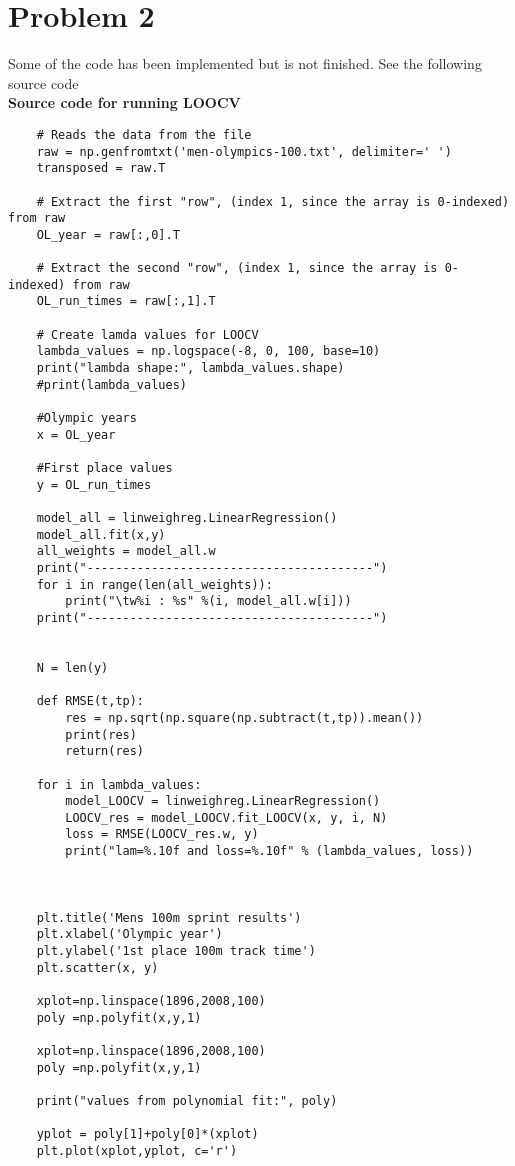 \section{Problem 2}
Some of the code has been implemented but is not finished. See the following source code
\\
\textbf{Source code for running LOOCV}
\begin{lstlisting}
    # Reads the data from the file
    raw = np.genfromtxt('men-olympics-100.txt', delimiter=' ')
    transposed = raw.T

    # Extract the first "row", (index 1, since the array is 0-indexed) from raw
    OL_year = raw[:,0].T

    # Extract the second "row", (index 1, since the array is 0-indexed) from raw
    OL_run_times = raw[:,1].T

    # Create lamda values for LOOCV
    lambda_values = np.logspace(-8, 0, 100, base=10)
    print("lambda shape:", lambda_values.shape)
    #print(lambda_values)

    #Olympic years
    x = OL_year 

    #First place values
    y = OL_run_times

    model_all = linweighreg.LinearRegression()
    model_all.fit(x,y)
    all_weights = model_all.w
    print("----------------------------------------")
    for i in range(len(all_weights)):
        print("\tw%i : %s" %(i, model_all.w[i]))
    print("----------------------------------------")


    N = len(y)

    def RMSE(t,tp):
        res = np.sqrt(np.square(np.subtract(t,tp)).mean())
        print(res)
        return(res)

    for i in lambda_values:
        model_LOOCV = linweighreg.LinearRegression()
        LOOCV_res = model_LOOCV.fit_LOOCV(x, y, i, N)
        loss = RMSE(LOOCV_res.w, y)
        print("lam=%.10f and loss=%.10f" % (lambda_values, loss))



    plt.title('Mens 100m sprint results')
    plt.xlabel('Olympic year')
    plt.ylabel('1st place 100m track time')
    plt.scatter(x, y)

    xplot=np.linspace(1896,2008,100)
    poly =np.polyfit(x,y,1)

    xplot=np.linspace(1896,2008,100)
    poly =np.polyfit(x,y,1)

    print("values from polynomial fit:", poly)

    yplot = poly[1]+poly[0]*(xplot)
    plt.plot(xplot,yplot, c='r')
\end{lstlisting}


